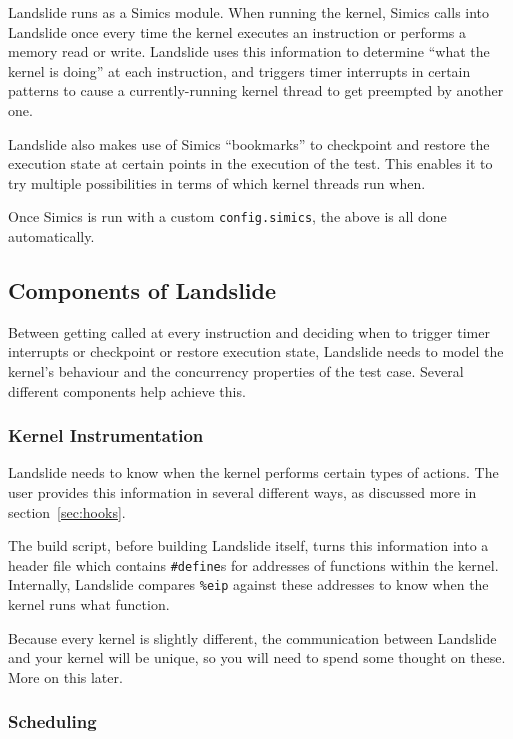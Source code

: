 \documentclass{article}
\begin{document}
Landslide runs as a Simics module. When running the kernel, Simics calls into Landslide once every time the kernel executes an instruction or performs a memory read or write. Landslide uses this information to determine ``what the kernel is doing'' at each instruction, and triggers timer interrupts in certain patterns to cause a currently-running kernel thread to get preempted by another one.

Landslide also makes use of Simics ``bookmarks'' to checkpoint and restore the execution state at certain points in the execution of the test. This enables it to try multiple possibilities in terms of which kernel threads run when.

Once Simics is run with a custom \texttt{config.simics}, the above is all done automatically.

\subsection{Components of Landslide}

Between getting called at every instruction and deciding when to trigger timer interrupts or checkpoint or restore execution state, Landslide needs to model the kernel's behaviour and the concurrency properties of the test case. Several different components help achieve this.

\subsubsection{Kernel Instrumentation}

Landslide needs to know when the kernel performs certain types of actions. The user provides this information in several different ways, as discussed more in section~\ref{sec:hooks}.

The build script, before building Landslide itself, turns this information into a header file which contains \texttt{\#define}s for addresses of functions within the kernel. Internally, Landslide compares \texttt{\%eip} against these addresses to know when the kernel runs what function.

Because every kernel is slightly different, the communication between Landslide and your kernel will be unique, so you will need to spend some thought on these. More on this later.

\subsubsection{Scheduling}
\end{document}
